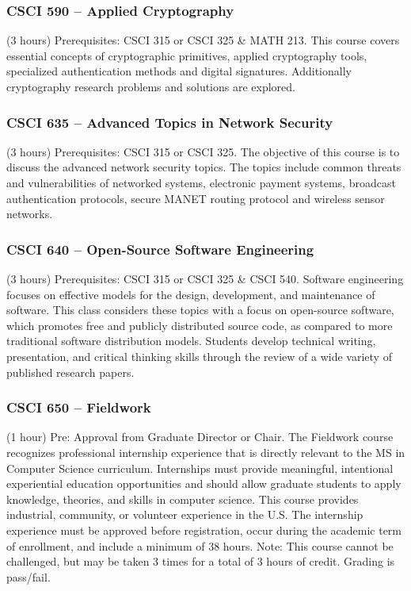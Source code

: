 \subsubsection{CSCI 590 -- Applied Cryptography}
(3 hours) Prerequisites:  CSCI 315 or CSCI 325 \& MATH 213. This course covers essential concepts of cryptographic primitives, applied cryptography tools, specialized authentication methods and digital signatures. Additionally cryptography research problems and solutions are explored.

\subsubsection{CSCI 635 -- Advanced Topics in Network Security}
(3 hours) Prerequisites:  CSCI 315 or CSCI 325. The objective of this course is to discuss the advanced network security topics. The topics include common threats and vulnerabilities of networked systems, electronic payment systems, broadcast authentication protocols, secure MANET routing protocol and wireless sensor networks. 

\subsubsection{CSCI 640 -- Open-Source Software Engineering}
(3 hours) Prerequisites: CSCI 315 or CSCI 325 \& CSCI 540. Software engineering focuses on effective models for the design, development, and maintenance of software. This class considers these topics with a focus on open-source software, which promotes free and publicly distributed source code, as compared to more traditional software distribution models. Students develop technical writing, presentation, and critical thinking skills through the review of a wide variety of published research papers.

\subsubsection{CSCI 650 -- Fieldwork}
(1 hour) Pre: Approval from Graduate Director or Chair. The Fieldwork course recognizes professional internship experience that is directly relevant to the MS in Computer Science curriculum. Internships must provide meaningful, intentional experiential education opportunities and should allow graduate students to apply knowledge, theories, and skills in computer science. This course provides industrial, community, or volunteer experience in the U.S. The internship experience must be approved before registration, occur during the academic term of enrollment, and include a minimum of 38 hours. Note: This course cannot be challenged, but may be taken 3 times for a total of 3 hours of credit. Grading is pass/fail.

